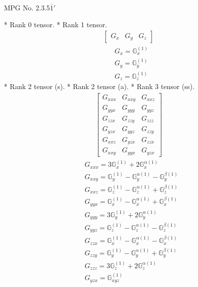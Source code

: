\documentclass[fleqn,8pt,landscape]{jsarticle}
\begin{document}
\setcounter{MaxMatrixCols}{32}

\renewcommand{\tablename}{Table~}
\renewcommand{\figurename}{Figure~}
\begin{center}
\LARGE
MPG No. 2.3.5\quad$\bar{1}'$
\end{center}
* Rank 0 tensor.
* Rank 1 tensor.
\begin{align*}
\begin{bmatrix} G_{x} & G_{y} & G_{z} \end{bmatrix}
\end{align*}
\begin{align*}
& G_{x} = \mathbb{G}_{x}^{(1)} \\
& G_{y} = \mathbb{G}_{y}^{(1)} \\
& G_{z} = \mathbb{G}_{z}^{(1)}
\end{align*}
* Rank 2 tensor (s).
* Rank 2 tensor (a).
* Rank 3 tensor (ss).
\begin{align*}
\begin{bmatrix} G_{xxx} & G_{xxy} & G_{xxz} \\ G_{yyx} & G_{yyy} & G_{yyz} \\ G_{zzx} & G_{zzy} & G_{zzz} \\ G_{yzx} & G_{yyz} & G_{zzy} \\ G_{xxz} & G_{yzx} & G_{zzx} \\ G_{xxy} & G_{yyx} & G_{yzx} \end{bmatrix}
\end{align*}
\begin{align*}
& G_{xxx} = 3 \mathbb{G}_{x}^{(1)} + 2 \mathbb{G}_{x}^{\alpha(1)} \\
& G_{xxy} = \mathbb{G}_{y}^{(1)} - \mathbb{G}_{y}^{\alpha(1)} - \mathbb{G}_{y}^{\beta(1)} \\
& G_{xxz} = \mathbb{G}_{z}^{(1)} - \mathbb{G}_{z}^{\alpha(1)} + \mathbb{G}_{z}^{\beta(1)} \\
& G_{yyx} = \mathbb{G}_{x}^{(1)} - \mathbb{G}_{x}^{\alpha(1)} + \mathbb{G}_{x}^{\beta(1)} \\
& G_{yyy} = 3 \mathbb{G}_{y}^{(1)} + 2 \mathbb{G}_{y}^{\alpha(1)} \\
& G_{yyz} = \mathbb{G}_{z}^{(1)} - \mathbb{G}_{z}^{\alpha(1)} - \mathbb{G}_{z}^{\beta(1)} \\
& G_{zzx} = \mathbb{G}_{x}^{(1)} - \mathbb{G}_{x}^{\alpha(1)} - \mathbb{G}_{x}^{\beta(1)} \\
& G_{zzy} = \mathbb{G}_{y}^{(1)} - \mathbb{G}_{y}^{\alpha(1)} + \mathbb{G}_{y}^{\beta(1)} \\
& G_{zzz} = 3 \mathbb{G}_{z}^{(1)} + 2 \mathbb{G}_{z}^{\alpha(1)} \\
& G_{yzx} = \mathbb{G}_{xyz}^{(1)}
\end{align*}
\end{document}
